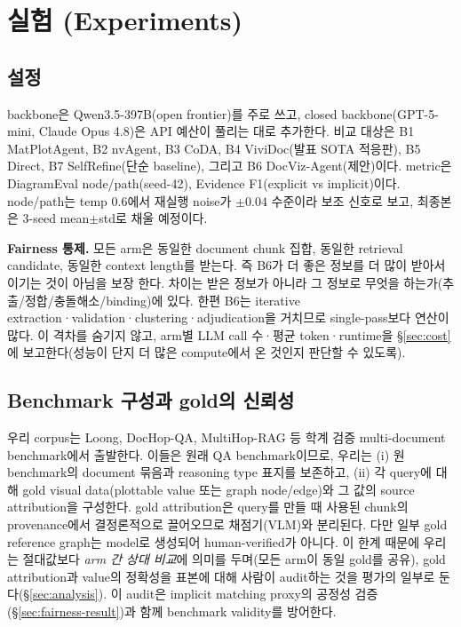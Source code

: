 \documentclass[11pt]{article}
\begin{document}
\section{실험 (Experiments)}

\subsection{설정}

backbone은 Qwen3.5-397B(open frontier)를 주로 쓰고, closed backbone(GPT-5-mini, Claude Opus
4.8)은 API 예산이 풀리는 대로 추가한다. 비교 대상은 B1 MatPlotAgent, B2 nvAgent, B3 CoDA,
B4 ViviDoc(발표 SOTA 적응판), B5 Direct, B7 SelfRefine(단순 baseline), 그리고 B6
DocViz-Agent(제안)이다. metric은 DiagramEval node/path(seed-42), Evidence F1(explicit vs
implicit)이다. node/path는 temp 0.6에서 재실행 noise가 $\pm 0.04$ 수준이라 보조 신호로 보고,
최종본은 3-seed mean$\pm$std로 채울 예정이다.

\textbf{Fairness 통제.} 모든 arm은 동일한 document chunk 집합, 동일한 retrieval candidate,
동일한 context length를 받는다. 즉 B6가 더 좋은 정보를 더 많이 받아서 이기는 것이 아님을 보장
한다. 차이는 받은 정보가 아니라 그 정보로 무엇을 하는가(추출/정합/충돌해소/binding)에 있다.
한편 B6는 iterative extraction·validation·clustering·adjudication을 거치므로 single-pass보다
연산이 많다. 이 격차를 숨기지 않고, arm별 LLM call 수·평균 token·runtime을 \S\ref{sec:cost}에
보고한다(성능이 단지 더 많은 compute에서 온 것인지 판단할 수 있도록).

\subsection{Benchmark 구성과 gold의 신뢰성}
\label{sec:bench}

우리 corpus는 Loong, DocHop-QA, MultiHop-RAG 등 학계 검증 multi-document benchmark에서
출발한다. 이들은 원래 QA benchmark이므로, 우리는 (i) 원 benchmark의 document 묶음과 reasoning
type 표지를 보존하고, (ii) 각 query에 대해 gold visual data(plottable value 또는 graph
node/edge)와 그 값의 source attribution을 구성한다. gold attribution은 query를 만들 때 사용된
chunk의 provenance에서 결정론적으로 끌어오므로 채점기(VLM)와 분리된다. 다만 일부 gold reference
graph는 model로 생성되어 human-verified가 아니다. 이 한계 때문에 우리는 절대값보다 \emph{arm 간
상대 비교}에 의미를 두며(모든 arm이 동일 gold를 공유), gold attribution과 value의 정확성을
표본에 대해 사람이 audit하는 것을 평가의 일부로 둔다(\S\ref{sec:analysis}). 이 audit은 implicit
matching proxy의 공정성 검증(\S\ref{sec:fairness-result})과 함께 benchmark validity를 방어한다.
\end{document}
